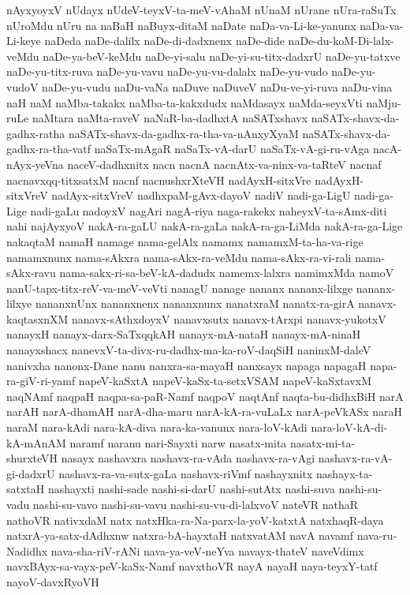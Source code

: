 {nAyxyoyxV
nUdayx
nUdeV-teyxV-ta-meV-vAhaM
nUnaM
nUrane
nUra-raSuTx
nUroMdu
nUru
na
naBaH
naBuyx-ditaM
naDate
naDa-va-Li-ke-yanunx
naDa-va-Li-keye
naDeda
naDe-dalilx
naDe-di-dadxnenx
naDe-dide
naDe-du-koM-Di-lalx-veMdu
naDe-ya-beV-keMdu
naDe-yi-salu
naDe-yi-su-titx-dadxrU
naDe-yu-tatxve
naDe-yu-titx-ruva
naDe-yu-vavu
naDe-yu-vu-dalalx
naDe-yu-vudo
naDe-yu-vudoV
naDe-yu-vudu
naDu-vaNa
naDuve
naDuveV
naDu-ve-yi-ruva
naDu-vina
naH
naM
naMba-takakx
naMba-ta-kakxdudx
naMdasayx
naMda-seyxVti
naMju-ruLe
naMtara
naMta-raveV
naNaR-ba-dadhxtA
naSATxshavx
naSATx-shavx-da-gadhx-ratha
naSATx-shavx-da-gadhx-ra-tha-va-nAnxyXyaM
naSATx-shavx-da-gadhx-ra-tha-vatf
naSaTx-mAgaR
naSaTx-vA-darU
naSaTx-vA-gi-ru-vAga
nacA-nAyx-yeVna
naceV-dadhxnitx
nacn
nacnA
nacnAtx-va-ninx-va-taRteV
nacnaf
nacnavxqq-titxsatxM
nacnf
nacnushxrXteVH
nadAyxH-sitxVre
nadAyxH-sitxVreV
nadAyx-sitxVreV
nadhxpaM-gAvx-dayoV
nadiV
nadi-ga-LigU
nadi-ga-Lige
nadi-gaLu
nadoyxV
nagAri
nagA-riya
naga-rakekx
naheyxV-ta-sAmx-diti
nahi
najAyxyoV
nakA-ra-gaLU
nakA-ra-gaLa
nakA-ra-ga-LiMda
nakA-ra-ga-Lige
nakaqtaM
namaH
namage
nama-gelAlx
namamx
namamxM-ta-ha-va-rige
namamxnunx
nama-sAkxra
nama-sAkx-ra-veMdu
nama-sAkx-ra-vi-rali
nama-sAkx-ravu
nama-sakx-ri-sa-beV-kA-dadudx
namemx-lalxra
namimxMda
namoV
nanU-tapx-titx-reV-va-meV-veVti
nanagU
nanage
nananx
nananx-lilxge
nananx-lilxye
nananxnUnx
nananxnenx
nananxnunx
nanatxraM
nanatx-ra-girA
nanavx-kaqtasxnXM
nanavx-sAthxdoyxV
nanavxsutx
nanavx-tArxpi
nanavx-yukotxV
nanayxH
nanayx-darx-SaTxqqkAH
nanayx-mA-nataH
nanayx-mA-ninaH
nanayxshacx
nanevxV-ta-divx-ru-dadhx-ma-ka-roV-daqSiH
naninxM-daleV
nanivxha
nanonx-Dane
nanu
nanxra-sa-mayaH
nanxsayx
napaga
napagaH
napa-ra-giV-ri-yamf
napeV-kaSxtA
napeV-kaSx-ta-setxVSAM
napeV-kaSxtavxM
naqNAmf
naqpaH
naqpa-sa-paR-Namf
naqpoV
naqtAnf
naqta-bu-didhxBiH
narA
narAH
narA-dhamAH
narA-dha-maru
narA-kA-ra-vuLaLx
narA-peVkASx
naraH
naraM
nara-kAdi
nara-kA-diva
nara-ka-vanunx
nara-loV-kAdi
nara-loV-kA-di-kA-mAnAM
naramf
naranu
nari-Sayxti
narw
nasatx-mita
nasatx-mi-ta-shurxteVH
nasayx
nashavxra
nashavx-ra-vAda
nashavx-ra-vAgi
nashavx-ra-vA-gi-dadxrU
nashavx-ra-va-sutx-gaLa
nashavx-riVmf
nashayxnitx
nashayx-ta-satxtaH
nashayxti
nashi-sade
nashi-si-darU
nashi-sutAtx
nashi-suva
nashi-su-vadu
nashi-su-vavo
nashi-su-vavu
nashi-su-vu-di-lalxvoV
nateVR
nathaR
nathoVR
nativxdaM
natx
natxHka-ra-Na-parx-la-yoV-katxtA
natxhaqR-daya
natxrA-ya-satx-dAdhxnw
natxra-bA-hayxtaH
natxvatAM
navA
navamf
nava-ru-Nadidhx
nava-sha-riV-rANi
nava-ya-veV-neYva
navayx-thateV
naveVdimx
navxBAyx-sa-vayx-peV-kaSx-Namf
navxthoVR
nayA
nayaH
naya-teyxY-tatf
nayoV-davxRyoVH
}
